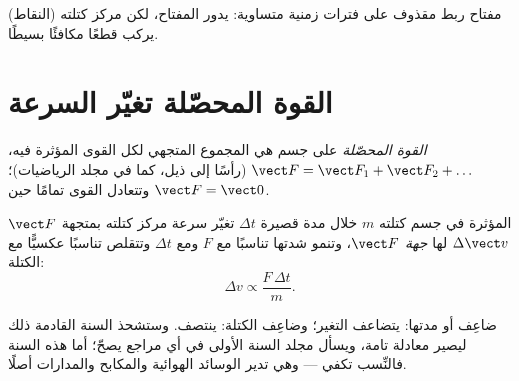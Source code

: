\begin{omfigure}

{\small مفتاح ربط مقذوف على فترات زمنية متساوية: يدور المفتاح، لكن
مركز كتلته (النقاط) يركب قطعًا مكافئًا بسيطًا.}
\end{omfigure}

\section{القوة المحصّلة تغيّر السرعة}

\begin{definition}\label{def:g11:forces-and-motion:netforce}
\emph{القوة المحصّلة} على جسم هي المجموع المتجهي
لكل القوى المؤثرة فيه، $\vect F = \vect F_1 + \vect F_2 + \dots$
(رأسًا إلى ذيل، كما في مجلد الرياضيات)؛ وتتعادل القوى
تمامًا حين $\vect F = \vect 0$.
\end{definition}

\begin{theorem}\label{thm:g11:forces-and-motion:secondlaw}
 $\vect F$ المؤثرة في جسم كتلته $m$ خلال مدة قصيرة
$\Delta t$ تغيّر سرعة مركز كتلته بمتجهة
$\Delta \vect v$ لها \emph{جهة} $\vect F$، وتنمو شدتها
تناسبًا مع $F$ ومع $\Delta t$ وتتقلص
تناسبًا عكسيًّا مع الكتلة:
\[
\Delta v \propto \frac{F \, \Delta t}{m} .
\]
\end{theorem}
\admitted

\begin{remark}
ضاعِف  أو مدتها: يتضاعف التغير؛ وضاعِف الكتلة: ينتصف.
وستشحذ السنة القادمة ذلك ليصير معادلة تامة، ويسأل مجلد السنة
الأولى في أي مراجع يصحّ؛ أما هذه السنة فالنِّسب تكفي ---
وهي تدير الوسائد الهوائية والمكابح والمدارات أصلًا.
\end{remark}

